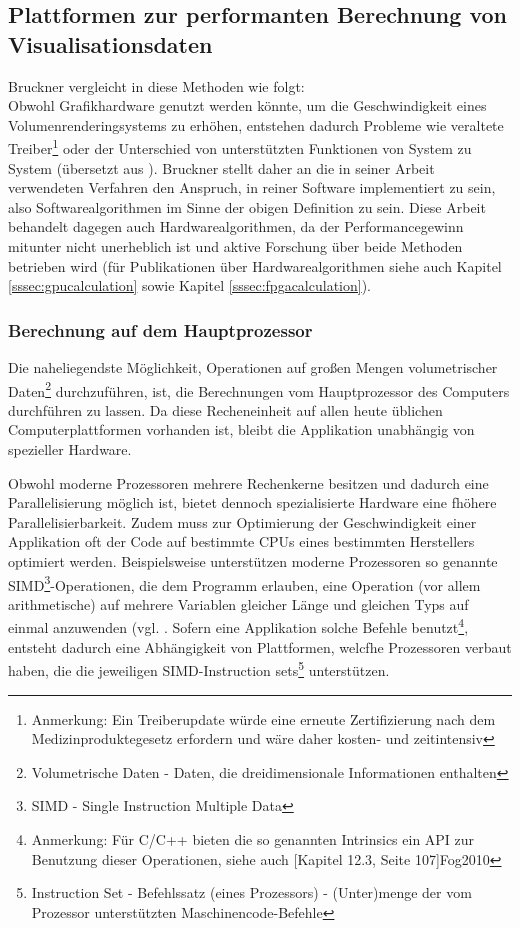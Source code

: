 \documentclass[pdftex,a4paper,titlepage,12pt]{scrartcl}
\newtheorem[L]{boxedDefinition}{Definition}
\begin{document}
\subsection{Plattformen zur performanten Berechnung von Visualisationsdaten}\label{ssec:platforms}
Bruckner vergleicht in \cite{Bruckner2004} diese Methoden wie folgt:\\
Obwohl Grafikhardware genutzt werden könnte, um die Geschwindigkeit eines Volumenrenderingsystems zu erhöhen, entstehen dadurch Probleme wie veraltete Treiber\footnote{Anmerkung: Ein Treiberupdate würde eine erneute Zertifizierung nach dem Medizinproduktegesetz erfordern und wäre daher kosten- und zeitintensiv} oder der Unterschied von unterstützten Funktionen von System zu System (übersetzt aus \cite[Kapitel 3.1.1, Seite 17, Paragraph \glqq Pure Software \grqq]{Bruckner2004}).
Bruckner stellt daher an die in seiner Arbeit verwendeten Verfahren den Anspruch, in reiner Software implementiert zu sein, also Softwarealgorithmen im Sinne der obigen Definition zu sein. Diese Arbeit behandelt dagegen auch Hardwarealgorithmen, da der Performancegewinn mitunter nicht unerheblich ist und aktive Forschung über beide Methoden betrieben wird (für Publikationen über Hardwarealgorithmen siehe auch Kapitel \ref{sssec:gpucalculation} sowie Kapitel \ref{sssec:fpgacalculation}).

\subsubsection{Berechnung auf dem Hauptprozessor}\label{sssec:cpucalculation}
Die naheliegendste Möglichkeit, Operationen auf großen Mengen volumetrischer Daten\footnote{Volumetrische Daten - Daten, die dreidimensionale Informationen enthalten} durchzuführen, ist, die Berechnungen vom Hauptprozessor des Computers durchführen zu lassen. Da diese Recheneinheit auf allen heute üblichen Computerplattformen vorhanden ist, bleibt die Applikation unabhängig von spezieller Hardware.

Obwohl moderne Prozessoren mehrere Rechenkerne besitzen und dadurch eine Parallelisierung möglich ist, bietet dennoch spezialisierte Hardware eine fhöhere Parallelisierbarkeit. Zudem muss zur Optimierung der Geschwindigkeit einer Applikation oft der Code auf bestimmte CPUs eines bestimmten Herstellers optimiert werden. Beispielsweise unterstützen moderne Prozessoren so genannte SIMD\footnote{SIMD - Single Instruction Multiple Data}-Operationen, die dem Programm erlauben, eine Operation (vor allem arithmetische) auf mehrere Variablen gleicher Länge und gleichen Typs auf einmal anzuwenden (vgl. \cite[Kapitel 12, Seite 103]{Fog2010}. Sofern eine Applikation solche Befehle benutzt\footnote{Anmerkung: Für C/C++ bieten die so genannten Intrinsics ein API zur Benutzung dieser Operationen, siehe auch [Kapitel 12.3, Seite 107]{Fog2010}}, entsteht dadurch eine Abhängigkeit von Plattformen, welcfhe Prozessoren verbaut haben, die die jeweiligen SIMD-Instruction sets\footnote{Instruction Set - Befehlssatz (eines Prozessors) - (Unter)menge der vom Prozessor unterstützten Maschinencode-Befehle} unterstützen.
\end{document}
